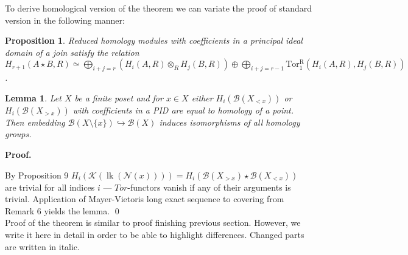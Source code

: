 \documentclass[a4paper, 12pt]{article}
\newtheorem{proposition}{Proposition}
\newtheorem{lemma}{Lemma}
\theoremstyle{definition}
\theoremstyle{remark}
\newenvironment{pf}{\noindent\textbf{Proof.}}{\qed}
\begin{document}
To derive homological version of the theorem we can variate the proof of standard version in the following manner:\\

\begin{proposition} {\cite[Lemma 2.1]{Milnor56}}
  Reduced homology modules with coefficients in a principal ideal domain of a join satisfy the relation
  $H_{r+1}(A \star B, R) \simeq \bigoplus_{i+j=r}(H_i(A,R) \otimes_R H_j(B,R)) \oplus \bigoplus_{i+j=r-1} \operatorname{Tor_1^R}(H_i(A,R),H_j(B,R))$.
\end{proposition}

\begin{lemma}
  Let $X$ be a finite poset and for $x \in X$ either $H_i(\mathcal{B}(X_{< x}))$ or $H_i(\mathcal{B}(X_{> x}))$ with coefficients in a PID are equal to homology of a point. Then embedding $\mathcal{B}(X \setminus \{x\}) \hookrightarrow \mathcal{B}(X)$ induces isomorphisms of all homology groups.
\end{lemma}

\begin{pf} ~ \par
  By Proposition 9 $H_i(\mathcal{K}(\operatorname{lk}(\mathcal{N}(x)))) = H_i(\mathcal{B}(X_{>x}) \star \mathcal{B}(X_{<x}))$ are trivial for all indices $i$ --- $Tor$-functors vanish if any of their arguments is trivial.
  Application of Mayer-Vietoris long exact sequence to covering from Remark 6 yields the lemma.
\end{pf}\\

Proof of the theorem is similar to proof finishing previous section. However, we write it here in detail in order to be able to highlight differences. Changed parts are written in italic.\\
\end{document}
